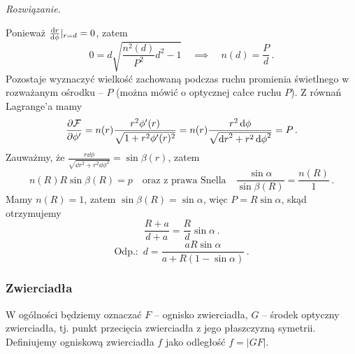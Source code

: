 \documentclass[../main.tex]{subfiles}
\begin{document}
\begin{enumerate}
\textit{Rozwiązanie.}
\medskip

Ponieważ \(\dv{r}{\phi}|_{r=d}=0\), zatem 
\begin{equation*}
    0=d\sqrt{\frac{n^2(d)}{P^2}d^2-1}\quad \implies \quad n(d)=\frac{P}{d}\,.
\end{equation*}
Pozostaje wyznaczyć wielkość zachowaną podczas ruchu promienia świetlnego w rozważanym ośrodku --
\(P\) (można mówić o optycznej całce ruchu \(P\)). Z równań Lagrange'a mamy
\begin{equation*}
    \pdv{\mathcal{F}}{\phi'}=n(r)\frac{r^2\phi'(r)}{\sqrt{1+r^2\phi'(r)^2}}=n(r)\frac{r^2\dd{\phi}}{\sqrt{\dd{r}^2+r^2\dd{\phi}^2}}=P\,.
\end{equation*}
Zauważmy, że \(\frac{r\dd{\phi}}{\sqrt{\dd{r}^2+r^2\dd{\phi}^2}}=\sin \beta(r)\), zatem
\begin{equation*}
    n(R)R\sin\beta(R)=p\quad \text{oraz z prawa Snella}\quad \frac{\sin \alpha }{\sin \beta(R)}=\frac{n(R)}{1}\,.
\end{equation*}
Mamy \(n(R)=1\), zatem \(\sin\beta(R)=\sin\alpha\), więc \(P=R\sin\alpha\), skąd otrzymujemy
\begin{equation*}
    \frac{R+a}{d+a}=\frac{R}{d}\sin\alpha\,.
\end{equation*}
\begin{equation*}
    \text{Odp.: }\,d=\frac{aR\sin\alpha}{a+R(1-\sin\alpha)}\,.
\end{equation*}
\end{enumerate}
\subsubsection{Zwierciadła}
W ogólności będziemy oznaczać \(F\) -- ognisko zwierciadła, \(G\) -- środek optyczny zwierciadła,
tj. punkt przecięcia zwierciadła z jego płaszczyzną symetrii. Definiujemy ogniskową zwierciadła
\(f\) jako odległość \(f=|GF|\).
\medskip
\end{document}
